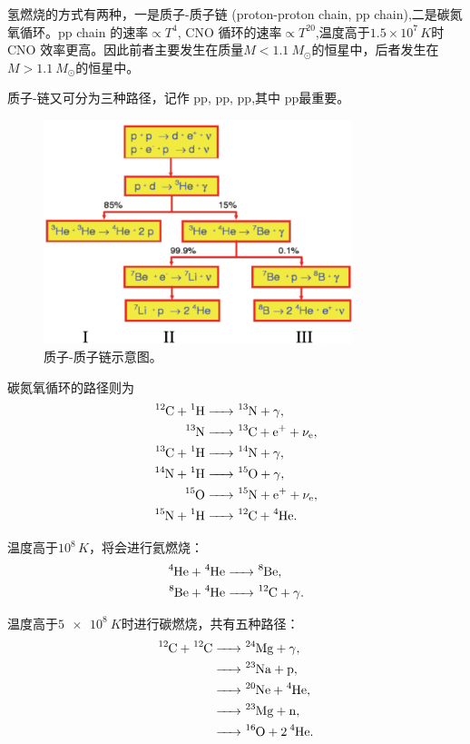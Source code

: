 \documentclass[../天体物理基础.tex]{subfiles}
\begin{document}
氢燃烧的方式有两种，一是质子{}-{}质子链 (proton-proton chain, pp chain),二是碳氮氧循环。pp chain 的速率$\propto T^{4}$, CNO 循环的速率$\propto{}T^{20}$,温度高于$1.5\times10^{7}\,\unit{K}$时 CNO 效率更高。因此前者主要发生在质量$M<\qty{1.1}{M_{\odot}}$的恒星中，后者发生在$M>\qty{1.1}{M_{\odot}}$的恒星中。

质子{}-{}链又可分为三种路径，记作 pp\uppercase\expandafter{}, pp\uppercase\expandafter{}, pp\uppercase\expandafter{},其中 pp\uppercase\expandafter{}最重要。
\begin{figure}[!htbp]
\centering
\includegraphics[width=9cm]{figures/figure2_1.png}
\captionsetup{justification=raggedright, singlelinecheck=false}
\caption{质子{}-{}质子链示意图。}
\label{ppchain}
\end{figure}

碳氮氧循环的路径则为
\begin{align*}
\ce{^{12}C +^{1}H &->^{13}N}+\gamma,\\
\ce{^{13}N &->^{13}C +e+}+\nu_{\ce{e}},\\
\ce{^{13}C +^{1}H &->^{14}N}+\gamma,\\
\ce{^{14}N +^{1}H &->^{15}O}+\gamma,\\
\ce{^{15}O &->^{15}N +e+}+\nu_{\ce{e}},\\
\ce{^{15}N +^{1}H &->^{12}C +^{4}He}.
\end{align*}

温度高于$10^{8}\,\unit{K}$，将会进行氦燃烧：
\begin{align*}
\ce{^{4}He +^{4}He &->^{8}Be},\\
\ce{^{8}Be +^{4}He &->^{12}C}+\gamma.
\end{align*}

温度高于$\qty{5e8}{K}$时进行碳燃烧，共有五种路径：
\begin{align}
\ce{^{12}C +^{12}C &->^{24}Mg}+\gamma,\notag\\
\ce{&->^{23}Na +p},\notag\\
\ce{&->^{20}Ne +^{4}He},\notag\\
\ce{&->^{23}Mg +n},\notag\\
\ce{&->^{16}O +2^{4}He}.\notag
\end{align}
\end{document}
